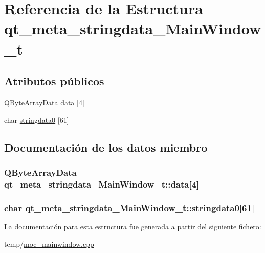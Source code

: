 \hypertarget{structqt__meta__stringdata___main_window__t}{}\section{Referencia de la Estructura qt\+\_\+meta\+\_\+stringdata\+\_\+\+Main\+Window\+\_\+t}
\label{structqt__meta__stringdata___main_window__t}
\subsection*{Atributos públicos}
\begin{DoxyCompactItemize}
\item 
Q\+Byte\+Array\+Data \hyperlink{structqt__meta__stringdata___main_window__t_a332d7fa058028f7613b5ba68abb5a7fe}{data} \mbox{[}4\mbox{]}
\item 
char \hyperlink{structqt__meta__stringdata___main_window__t_a29e469f83de40376316408ec9bde67ca}{stringdata0} \mbox{[}61\mbox{]}
\end{DoxyCompactItemize}


\subsection{Documentación de los datos miembro}
\subsubsection[{\texorpdfstring{data}{data}}]{\setlength{\rightskip}{0pt plus 5cm}Q\+Byte\+Array\+Data qt\+\_\+meta\+\_\+stringdata\+\_\+\+Main\+Window\+\_\+t\+::data\mbox{[}4\mbox{]}}\hypertarget{structqt__meta__stringdata___main_window__t_a332d7fa058028f7613b5ba68abb5a7fe}{}\label{structqt__meta__stringdata___main_window__t_a332d7fa058028f7613b5ba68abb5a7fe}
\subsubsection[{\texorpdfstring{stringdata0}{stringdata0}}]{\setlength{\rightskip}{0pt plus 5cm}char qt\+\_\+meta\+\_\+stringdata\+\_\+\+Main\+Window\+\_\+t\+::stringdata0\mbox{[}61\mbox{]}}\hypertarget{structqt__meta__stringdata___main_window__t_a29e469f83de40376316408ec9bde67ca}{}\label{structqt__meta__stringdata___main_window__t_a29e469f83de40376316408ec9bde67ca}


La documentación para esta estructura fue generada a partir del siguiente fichero\+:\begin{DoxyCompactItemize}
\item 
temp/\hyperlink{moc__mainwindow_8cpp}{moc\+\_\+mainwindow.\+cpp}\end{DoxyCompactItemize}
